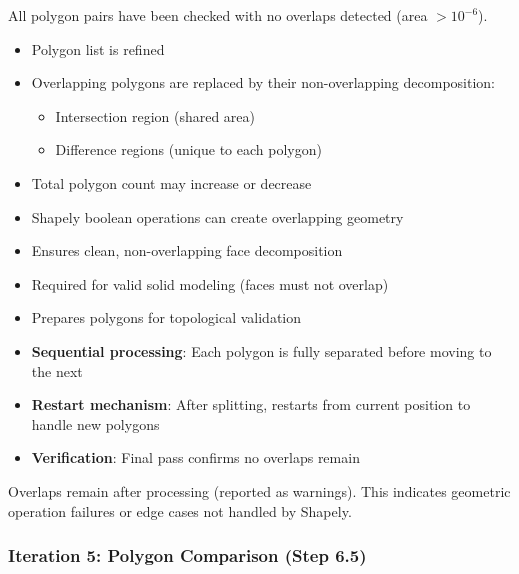 All polygon pairs have been checked with no overlaps detected (area $> 10^{-6}$).

\begin{itemize}
    \item Polygon list is refined
    \item Overlapping polygons are replaced by their non-overlapping decomposition:
    \begin{itemize}
        \item Intersection region (shared area)
        \item Difference regions (unique to each polygon)
    \end{itemize}
    \item Total polygon count may increase or decrease
\end{itemize}

\begin{itemize}
    \item Shapely boolean operations can create overlapping geometry
    \item Ensures clean, non-overlapping face decomposition
    \item Required for valid solid modeling (faces must not overlap)
    \item Prepares polygons for topological validation
\end{itemize}

\begin{itemize}
    \item \textbf{Sequential processing}: Each polygon is fully separated before moving to the next
    \item \textbf{Restart mechanism}: After splitting, restarts from current position to handle new polygons
    \item \textbf{Verification}: Final pass confirms no overlaps remain
\end{itemize}

Overlaps remain after processing (reported as warnings). This indicates geometric operation failures or edge cases not handled by Shapely.

\subsubsection{Iteration 5: Polygon Comparison (Step 6.5)}


